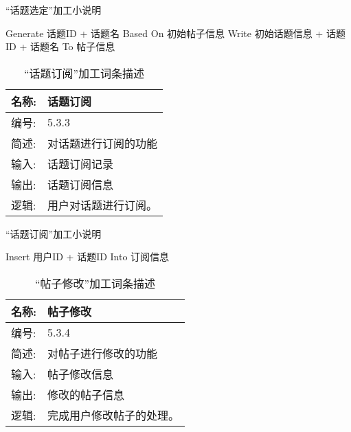 \begin{algorithm}[H]
    \renewcommand{\thealgorithm}{}
    \caption{“话题选定”加工小说明} 
    \label{alg3} 
    \begin{algorithmic}[1]
        \STATE Generate 话题ID + 话题名 Based On 初始帖子信息
        \STATE Write 初始话题信息 + 话题ID + 话题名 To 帖子信息
    \end{algorithmic} 
\end{algorithm}

\begin{table}[H]  
\caption{“话题订阅”加工词条描述}  
\begin{center}  
    \begin{tabular}{l p{11cm}} 
        \hline
        \quad 名称:  &  话题订阅 \\
        \hline
        \quad 编号:  & 5.3.3 \\
        \hline
        \quad 简述:  & 对话题进行订阅的功能 \\
        \hline
        \quad 输入:  & 话题订阅记录 \\
        \hline
        \quad 输出:  & 话题订阅信息 \\
        \hline
        \quad 逻辑:  & 用户对话题进行订阅。 \\
        \hline
    \end{tabular}
    \label{tab1}
\end{center}
\end{table}

\begin{algorithm}[H]
    \renewcommand{\thealgorithm}{}
    \caption{“话题订阅”加工小说明} 
    \label{alg3} 
    \begin{algorithmic}[1]
        \STATE Insert 用户ID + 话题ID Into 订阅信息
    \end{algorithmic} 
\end{algorithm}


\begin{table}[H]  
\caption{“帖子修改”加工词条描述}  
\begin{center}  
    \begin{tabular}{l p{11cm}} 
        \hline
        \quad 名称:  &  帖子修改 \\
        \hline
        \quad 编号:  & 5.3.4 \\
        \hline
        \quad 简述:  & 对帖子进行修改的功能 \\
        \hline
        \quad 输入:  & 帖子修改信息 \\
        \hline
        \quad 输出:  & 修改的帖子信息 \\
        \hline
        \quad 逻辑:  & 完成用户修改帖子的处理。 \\
        \hline
    \end{tabular}
    \label{tab1}
\end{center}
\end{table}

